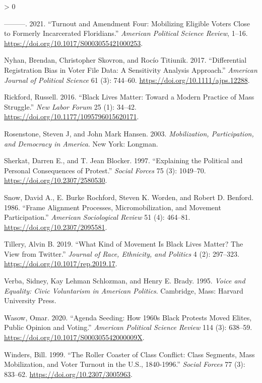 \documentclass[
  12pt,
]{article}
\newlength{\cslhangindent}
\newenvironment{CSLReferences}[2] %
 {%
  \setlength{\parindent}{0pt}
  \ifodd #1 \everypar{\setlength{\hangindent}{\cslhangindent}}\ignorespaces\fi
  \ifnum #2 > 0
  \setlength{\parskip}{#2\baselineskip}
  \fi
 }%
 {}
\begin{document}
\begin{CSLReferences}{1}{0}
\leavevmode\hypertarget{ref-Morris2021}{}%
---------. 2021. {``Turnout and {Amendment Four}: {Mobilizing Eligible Voters Close} to {Formerly Incarcerated Floridians}.''} \emph{American Political Science Review}, 1--16. \url{https://doi.org/10.1017/S0003055421000253}.

\leavevmode\hypertarget{ref-Nyhan2017}{}%
Nyhan, Brendan, Christopher Skovron, and Rocío Titiunik. 2017. {``Differential {Registration Bias} in {Voter File Data}: {A Sensitivity Analysis Approach}.''} \emph{American Journal of Political Science} 61 (3): 744--60. \url{https://doi.org/10.1111/ajps.12288}.

\leavevmode\hypertarget{ref-Rickford2016}{}%
Rickford, Russell. 2016. {``Black {Lives Matter}: {Toward} a {Modern Practice} of {Mass Struggle}.''} \emph{New Labor Forum} 25 (1): 34--42. \url{https://doi.org/10.1177/1095796015620171}.

\leavevmode\hypertarget{ref-Rosenstone2003}{}%
Rosenstone, Steven J, and John Mark Hansen. 2003. \emph{Mobilization, Participation, and Democracy in {America}}. {New York}: {Longman}.

\leavevmode\hypertarget{ref-Sherkat1997}{}%
Sherkat, Darren E., and T. Jean Blocker. 1997. {``Explaining the {Political} and {Personal Consequences} of {Protest}.''} \emph{Social Forces} 75 (3): 1049--70. \url{https://doi.org/10.2307/2580530}.

\leavevmode\hypertarget{ref-Snow1986}{}%
Snow, David A., E. Burke Rochford, Steven K. Worden, and Robert D. Benford. 1986. {``Frame {Alignment Processes}, {Micromobilization}, and {Movement Participation}.''} \emph{American Sociological Review} 51 (4): 464--81. \url{https://doi.org/10.2307/2095581}.

\leavevmode\hypertarget{ref-Tillery2019}{}%
Tillery, Alvin B. 2019. {``What {Kind} of {Movement} Is {Black Lives Matter}? {The View} from {Twitter}.''} \emph{Journal of Race, Ethnicity, and Politics} 4 (2): 297--323. \url{https://doi.org/10.1017/rep.2019.17}.

\leavevmode\hypertarget{ref-Verba1995}{}%
Verba, Sidney, Kay Lehman Schlozman, and Henry E. Brady. 1995. \emph{Voice and Equality: Civic Voluntarism in {American} Politics}. {Cambridge, Mass}: {Harvard University Press}.

\leavevmode\hypertarget{ref-Wasow2020}{}%
Wasow, Omar. 2020. {``Agenda {Seeding}: {How} 1960s {Black Protests Moved Elites}, {Public Opinion} and {Voting}.''} \emph{American Political Science Review} 114 (3): 638--59. \url{https://doi.org/10.1017/S000305542000009X}.

\leavevmode\hypertarget{ref-Winders1999}{}%
Winders, Bill. 1999. {``The {Roller Coaster} of {Class Conflict}: {Class Segments}, {Mass Mobilization}, and {Voter Turnout} in the {U}.{S}., 1840-1996.''} \emph{Social Forces} 77 (3): 833--62. \url{https://doi.org/10.2307/3005963}.

\end{CSLReferences}
\end{document}
